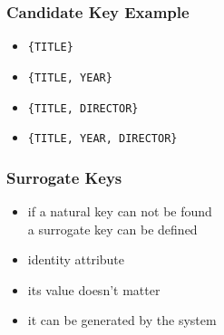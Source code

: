 \documentclass[dvipsnames]{beamer}
\theoremstyle{plain}
\begin{document}
\begin{frame}
  \frametitle{Candidate Key Example}

  \begin{example}
    \begin{itemize}
      \item \texttt{\{TITLE\}}

      \pause
      \item \texttt{\{TITLE, YEAR\}}

      \pause
      \item \texttt{\{TITLE, DIRECTOR\}}

      \pause
      \item \texttt{\{TITLE, YEAR, DIRECTOR\}}
    \end{itemize}
  \end{example}
\end{frame}

\begin{frame}
  \frametitle{Surrogate Keys}

  \begin{itemize}
    \item if a \alert{natural key} can not be found\\
      a \alert{surrogate key} can be defined

    \pause
    \medskip
    \item identity attribute
    \item its value doesn't matter
    \item it can be generated by the system
  \end{itemize}
\end{frame}
\end{document}
